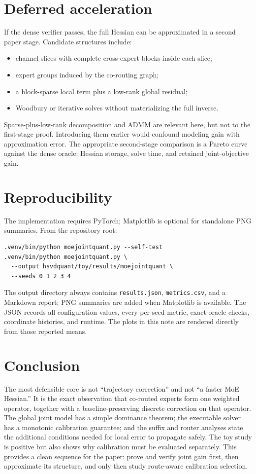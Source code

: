 \documentclass[11pt]{article}
\theoremstyle{plain}
\theoremstyle{definition}
\theoremstyle{remark}
\begin{document}
\section{Deferred acceleration}

If the dense verifier passes, the full Hessian can be approximated in a second paper stage.  Candidate structures include:
\begin{itemize}
  \item channel slices with complete cross-expert blocks inside each slice;
  \item expert groups induced by the co-routing graph;
  \item a block-sparse local term plus a low-rank global residual;
  \item Woodbury or iterative solves without materializing the full inverse.
\end{itemize}

Sparse-plus-low-rank decomposition and ADMM are relevant here, but not to the first-stage proof.  Introducing them earlier would confound modeling gain with approximation error.  The appropriate second-stage comparison is a Pareto curve against the dense oracle: Hessian storage, solve time, and retained joint-objective gain.

\section{Reproducibility}

The implementation requires PyTorch; Matplotlib is optional for standalone PNG summaries.  From the repository root:
\begin{verbatim}
.venv/bin/python moejointquant.py --self-test
.venv/bin/python moejointquant.py \
  --output hsvdquant/toy/results/moejointquant \
  --seeds 0 1 2 3 4
\end{verbatim}

The output directory always contains \texttt{results.json}, \texttt{metrics.csv}, and a Markdown report; PNG summaries are added when Matplotlib is available.  The JSON records all configuration values, every per-seed metric, exact-oracle checks, coordinate histories, and runtime.  The plots in this note are rendered directly from those reported means.

\section{Conclusion}

The most defensible core is not ``trajectory correction'' and not ``a faster MoE Hessian.''  It is the exact observation that co-routed experts form one weighted operator, together with a baseline-preserving discrete correction on that operator.  The global joint model has a simple dominance theorem; the executable solver has a monotonic calibration guarantee; and the suffix and router analyses state the additional conditions needed for local error to propagate safely.  The toy study is positive but also shows why calibration must be evaluated separately.  This provides a clean sequence for the paper: prove and verify joint gain first, then approximate its structure, and only then study route-aware calibration selection.
\end{document}
